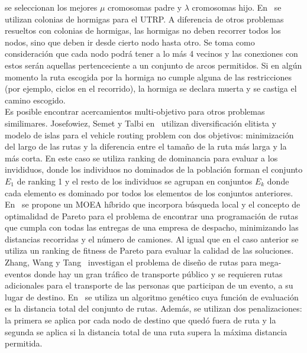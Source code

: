 se seleccionan los mejores $\mu$ cromosomas padre y $\lambda$ cromosomas hijo.
En~\cite{jiang2010improved} se utilizan colonias de hormigas para el UTRP. A diferencia de otros problemas resueltos con colonias de
hormigas, las hormigas no deben recorrer todos los nodos, sino que deben ir desde cierto nodo hasta otro.
Se toma como consideraci\'on que cada nodo podr\'a tener a lo m\'as 4 vecinos y las conexiones con estos ser\'an aquellas pertenceciente a
un conjunto de arcos permitidos. Si en alg\'un momento la ruta escogida por la hormiga no cumple
alguna de las restricciones (por ejemplo, ciclos en el recorrido), la hormiga se declara muerta y se castiga el
camino escogido.\\

Es posible encontrar acercamientos multi-objetivo para otros problemas similimares. Josefowiez, Semet y Talbi
en~\cite{vrprb} utilizan diversificaci\'on elitista y modelo de islas para el vehicle routing problem con
dos objetivos: minimizaci\'on del largo de las rutas y la diferencia entre el tama\~no de la ruta m\'as larga y la m\'as corta.
En este caso se utiliza ranking de dominancia para evaluar a los invididuos, donde los individuos no dominados de la poblaci\'on
forman el conjunto $E_1$ de ranking 1 y el resto de los individuos se agrupan en conjuntos $E_k$ donde cada elemento es dominado
por todos los elementos de los conjuntos anteriores.
En~\cite{ttvrp} se propone un MOEA h\'ibrido que incorpora b\'usqueda local y el concepto de optimalidad de Pareto para el
problema de encontrar una programaci\'on de rutas que cumpla con todas las entregas de una empresa de despacho, minimizando las distancias
recorridas y el n\'umero de camiones. Al igual que en el caso anterior se utiliza un ranking de fitness de Pareto para evaluar la calidad
de las soluciones. Zhang, Wang y Tang~\cite{events} investigan el problema de dise\~no de rutas para mega-eventos donde hay un gran
tr\'afico de transporte p\'ublico y se requieren rutas adicionales para el transporte de las personas que participan de un evento,
a su lugar de destino. En~\cite{events} se utiliza un algoritmo gen\'etico cuya funci\'on de evaluaci\'on es la distancia total del
conjunto de rutas. Adem\'as, se utilizan dos penalizaciones: la primera se aplica por cada nodo de destino que qued\'o fuera de ruta y
la segunda se aplica si la distancia total de una ruta supera la m\'axima distancia permitida.\\

